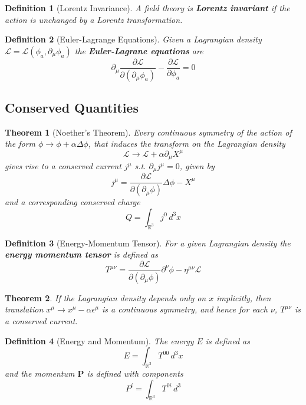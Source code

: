 \documentclass{article}
\newtheorem{theorem}{Theorem}[subsection]
\newtheorem{definition}{Definition}[subsection]
\newcommand{\eps}{\epsilon}
\newcommand{\del}{\partial}
\newcommand{\bam}[1]{\textbf{#1}}
\newcommand{\mbb}[1]{\mathbb{#1}}
\newcommand{\mc}[1]{\mathcal{#1}}
\newcommand{\pd}[2][]{\frac{\partial#1}{\partial#2}} %
\begin{document}
\begin{definition}[Lorentz Invariance]
A field theory is \bam{Lorentz invariant} if the action is unchanged by a Lorentz transformation. 
\end{definition}

\begin{definition}[Euler-Lagrange Equations]
Given a Lagrangian density $\mathcal{L}=\mathcal{L}(\phi_a,\del_\mu \phi_a)$ the \bam{Euler-Lagrane equations} are 
\[
\del_\mu \pd[\mc{L}]{(\del_\mu \phi_a)}-\pd[\mc{L}]{\phi_a}=0
\]
\end{definition}

\subsection{Conserved Quantities}

\begin{theorem}[Noether's Theorem]
Every continuous symmetry of the action of the form $\phi\to\phi+\alpha\Delta\phi$, that induces the transform on the Lagrangian density 
\[
\mc{L} \to \mc{L}+\alpha \del_\mu X^\mu
\]
gives rise to a conserved current $j^\mu$ s.t. $\del_\mu j^\mu = 0$, given by
\[
j^\mu = \pd[\mc{L}]{(\del_\mu \phi)}\Delta\phi-X^\mu
\]
and a corresponding conserved charge
\[
Q=\int_{\mbb{R}^3} j^0 \, d^3x
\]
\end{theorem}

\begin{definition}[Energy-Momentum Tensor]
For a given Lagrangian density the \bam{energy momentum tensor} is defined as  
\[
T^{\mu\nu}=\pd[\mc{L}]{(\del_\mu \phi)} \del^\nu \phi - \eta^{\mu\nu}\mc{L}
\]
\end{definition}

\begin{theorem}
If the Lagrangian density depends only on $x$ implicitly, then translation $x^\mu \to x^\mu-\alpha\eps^\mu$ is a continuous symmetry, and hence for each $\nu$, $T^{\mu\nu}$ is a conserved current. 
\end{theorem}

\begin{definition}[Energy and Momentum]
The energy $E$ is defined as 
\[
E=\int_{\mbb{R}^3} T^{00} \, d^3x
\]
and the momentum $\bm{P}$ is defined with components 
\[
P^i = \int_{\mbb{R}^3} T^{0i} \, d^3
\]


\end{definition}
\end{document}
